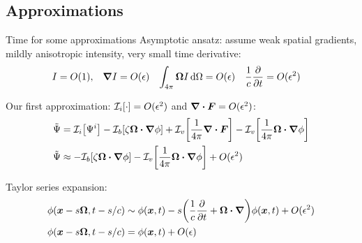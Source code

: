 \documentclass{beamer}
\begin{document}
\subsection{Approximations}
\begin{frame}{Time for some approximations}
  Asymptotic ansatz: assume weak spatial gradients, mildly anisotropic intensity, very small time
  derivative:
\begin{align*}
  I &= O(1), &
  \bm{\nabla} I &= O(\epsilon)&
  \int_{4\pi} \bm{\Omega} I\mathop{}\!\mathrm{d}\Omega &= O(\epsilon)&
  \frac{1}{c} \frac{\partial }{\partial t} &= O(\epsilon^2)
\end{align*}

Our first approximation: $\mathcal{I}_{i}\!\left[\cdot\right] = O(\epsilon^2)$ and $\bm{\nabla} \bm{\cdot} \bm{F} =
O(\epsilon^2)$:
\begin{align*}
  \tilde \Psi &=
  \mathcal{I}_{i}\!\left[\Psi^i\right]
  - \mathcal{I}_{b}\!\left[\zeta\bm{\Omega}\bm{\cdot} \bm{\nabla} \phi\right]
  + \mathcal{I}_{v}\!\left[\frac{1}{4\pi} \bm{\nabla} \bm{\cdot}\bm{F}\right] -
  \mathcal{I}_{v}\!\left[\frac{1}{4\pi} \bm{\Omega}\bm{\cdot} \bm{\nabla} \phi\right]
    \\ 
  \tilde \Psi 
  &\approx -\mathcal{I}_{b}\!\left[\zeta\bm{\Omega}\bm{\cdot} \bm{\nabla} \phi\right]
  - \mathcal{I}_{v}\!\left[\frac{1}{4\pi} \bm{\Omega}\bm{\cdot} \bm{\nabla} \phi\right]
  + O(\epsilon^2)
\end{align*}

Taylor series expansion:
\begin{align} \nonumber
  \phi(\bm{x} - s\bm{\Omega}, t - s/c)
  &\sim \phi(\bm{x}, t)
  - s \bigg( \frac{1}{c} \frac{\partial }{\partial t} + \bm{\Omega} \bm{\cdot} \bm{\nabla} \bigg)
  \phi(\bm{x}, t) + O(\epsilon^2)
\\ \label{eq:taylorPhi}
\phi(\bm{x} - s\bm{\Omega}, t - s/c)
&= \phi(\bm{x}, t) + O(\epsilon)
\end{align}
\end{frame}
\end{document}
